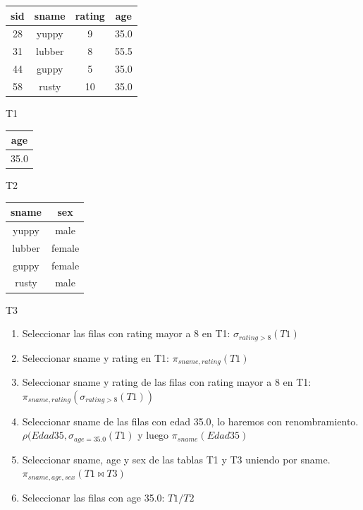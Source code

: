 \documentclass[11pt,letterpaper]{article}
\begin{document}
\begin{table}[h!]
\parbox{.3\linewidth}{
\center
\begin{tabular}{|c|c|c|c|}
	\hline
	sid & sname & rating & age \\ \hline\hline
	28 & yuppy & 9  & 35.0 \\ \hline
	31 & lubber & 8 & 55.5 \\ \hline
	44 & guppy & 5  & 35.0 \\ \hline
	58 & rusty & 10 & 35.0 \\ \hline
\end{tabular}\par
\bigskip
T1
}
\hfill
\parbox{.3\linewidth}{
\center
\begin{tabular}{|c|}
\hline
	age \\ \hline \hline
	35.0 \\ \hline
	
\end{tabular}\par
\bigskip
T2
}
\parbox{.3\linewidth}{
\center
\begin{tabular}{|c|c|}
	\hline
	sname & sex \\ \hline\hline
	yuppy & male \\ \hline
	lubber & female \\ \hline
	guppy & female \\ \hline
	rusty & male \\ \hline
\end{tabular}\par
\bigskip
T3
}
\end{table}

\begin{enumerate}
	\item Seleccionar las filas con rating mayor a 8 en T1: $\sigma_{rating>8}(T1)$
	\item Seleccionar sname y rating en T1: $\pi_{sname,rating}(T1)$
	\item Seleccionar sname y rating de las filas con rating mayor a 8 en T1: $\pi_{sname,rating}(\sigma_{rating>8}(T1))$
	\item Seleccionar sname de las filas con edad 35.0, lo haremos con renombramiento. $\rho(Edad35,\sigma_{age=35.0}(T1)$ y luego $\pi_{sname}(Edad35)$
	\item Seleccionar sname, age y sex de las tablas T1 y T3 uniendo por sname. $\pi_{sname,age,sex}(T1 \Join T3)$
	\item Seleccionar las filas con age 35.0: $T1/T2$
\end{enumerate}
\end{document}
